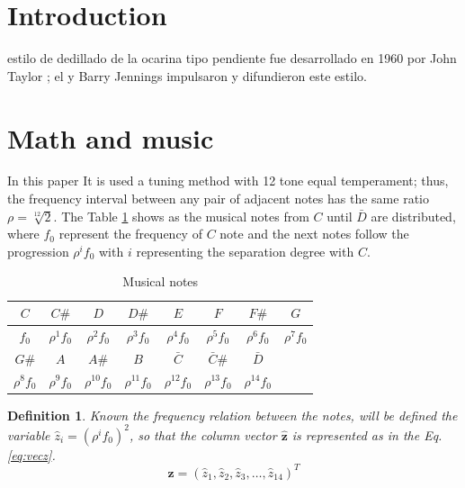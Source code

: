 \documentclass[journal]{IEEEtran}
\newtheorem{mydef}{Definition}
\begin{document}
\section{Introduction}

  estilo de dedillado de la ocarina tipo pendiente fue desarrollado en 1960
por John Taylor \cite{JohnTaylorRef} ; el y Barry Jennings \cite{BarryJenningsRef} impulsaron 
y difundieron este estilo.


\section{Math and music}
In this paper It is used a tuning method with 12 tone equal temperament; thus, the frequency interval
between any pair of adjacent notes has the same ratio $\rho = {\sqrt[12]{2}}$.
The Table \ref{tab:notes} shows as the musical notes from $C$ until $\bar{D}$
are  distributed, where $f_0$ represent the frequency of $C$ note and the next notes
follow the progression ${\rho}^i f_{0}$ with $i$ representing the separation degree with $C$. 

\begin{table}[h]
\center
{\renewcommand{\arraystretch}{1.5}
\begin{tabular}{c|c|c|c|c|c|c|c}
\hline
$C$ & $C\#$ & $D$ & $D\#$ & $E$ & $F$ & $F\#$ & $G$ \\ \hline
$f_{0}$ & ${\rho}^1 f_{0}$ & ${\rho}^2 f_{0}$ & ${\rho}^3 f_{0}$ & ${\rho}^4 f_{0}$ & ${\rho}^5 f_{0}$ & ${\rho}^6 f_{0}$ & ${\rho}^7 f_{0}$  \\
\hline \hline 
$G\#$ & $A$ & $A\#$ & $B$ & $\bar{C}$ & $\bar{C}\#$ & $\bar{D}$  & ~\\ \hline
${\rho}^8 f_{0}$ & ${\rho}^9 f_{0}$ & ${\rho}^{10} f_{0}$ & ${\rho}^{11} f_{0}$ & ${\rho}^{12} f_{0}$ & ${\rho}^{13} f_{0}$ & ${\rho}^{14} f_{0}$ & ~\\ 
\hline
\end{tabular}
}
\caption{Musical notes}
\label{tab:notes}
\end{table}

\begin{mydef}
Known the frequency relation between the notes, will be defined the variable $\hat{z}_i=\left( {\rho}^{i} f_0 \right)^{2} $,
so that the  column vector $\mathbf{\hat{z}}$ is represented as in the Eq. \ref{eq:vecz}.
\begin{equation} \label{eq:vecz}
\mathbf{\hat{z}}
= \left( \hat{z}_1, \hat{z}_2, \hat{z}_3, \hdots, \hat{z}_{14}\right)^{T}
\end{equation}
 
\end{mydef}
\end{document}
